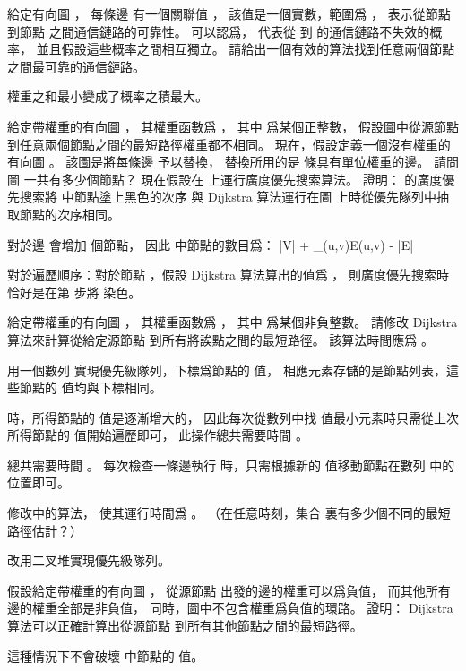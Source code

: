 \startANSWER
{}
\stopANSWER

\startEXERCISE
給定有向圖 ，
每條邊  有一個關聯值 ，
該值是一個實數，範圍爲 ，
表示從節點  到節點  之間通信鏈路的可靠性。
可以認爲，  代表從  到  的通信鏈路不失效的概率，
並且假設這些概率之間相互獨立。
請給出一個有效的算法找到任意兩個節點之間最可靠的通信鏈路。
\stopEXERCISE

\startANSWER
權重之和最小變成了概率之積最大。
\stopANSWER

\startEXERCISE
給定帶權重的有向圖 ，
其權重函數爲 ，
其中  爲某個正整數，
假設圖中從源節點  到任意兩個節點之間的最短路徑權重都不相同。
現在，假設定義一個沒有權重的有向圖 。
該圖是將每條邊  予以替換，
替換所用的是  條具有單位權重的邊。
請問圖  一共有多少個節點？
現在假設在  上運行廣度優先搜索算法。
證明：  的廣度優先搜索將  中節點塗上黑色的次序
與 Dijkstra 算法運行在圖  上時從優先隊列中抽取節點的次序相同。
\stopEXERCISE

\startANSWER
對於邊  會增加  個節點，
因此  中節點的數目爲：
\startformula
|V| + \sum_{(u,v)\in E}\omega(u,v) - |E|
\stopformula

對於遍歷順序：對於節點 ，假設 Dijkstra 算法算出的值爲 ，
則廣度優先搜索時恰好是在第  步將  染色。
\stopANSWER

\startEXERCISE[exercise:24.3-8]
給定帶權重的有向圖 ，
其權重函數爲 ，
其中  爲某個非負整數。
請修改 Dijkstra 算法來計算從給定源節點  到所有將誒點之間的最短路徑。
該算法時間應爲 。
\stopEXERCISE

\startANSWER
用一個數列  實現優先級隊列，下標爲節點的  值，
相應元素存儲的是節點列表，這些節點的  值均與下標相同。

 時，所得節點的  值是逐漸增大的，
因此每次從數列中找  值最小元素時只需從上次所得節點的  值開始遍歷即可，
此操作總共需要時間 。

 總共需要時間 。
每次檢查一條邊執行  時，只需根據新的  值移動節點在數列  中的位置即可。
\stopANSWER

\startEXERCISE
修改\inexercise[24.3-8] 中的算法，
使其運行時間爲 。
（\hint 在任意時刻，集合  裏有多少個不同的最短路徑估計？）
\stopEXERCISE

\startANSWER
改用二叉堆實現優先級隊列。
\stopANSWER

\startEXERCISE
假設給定帶權重的有向圖 ，
從源節點  出發的邊的權重可以爲負值，
而其他所有邊的權重全部是非負值，
同時，圖中不包含權重爲負值的環路。
證明： Dijkstra 算法可以正確計算出從源節點  到所有其他節點之間的最短路徑。
\stopEXERCISE

\startANSWER
這種情況下不會破壞  中節點的  值。
\stopANSWER

\stopsection
